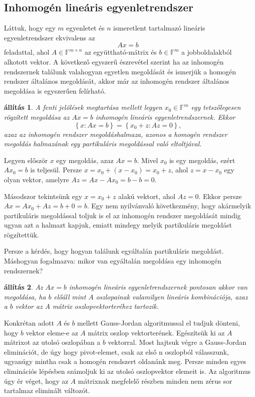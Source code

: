 \documentclass[9pt, showtrims]{memoir}
\makeatletter
\renewenvironment{proof}[1][\proofname]
    {\par\pushQED{\qed}%
    \normalfont \topsep6\p@\@plus6\p@\relax
    \trivlist
    \item[\hskip\labelsep
        \itshape
    #1\@addpunct{:}]\ignorespaces}
    {\popQED\endtrivlist\@endpefalse}
\theoremstyle{plain}
\newtheorem{proposition}{állítás}[section]
\theoremstyle{remark}
\theoremstyle{definition}
\makeatother
\begin{document}
\subsection{Inhomogén lineáris egyenletrendszer}
Láttuk, hogy egy $m$ egyenletet és $n$ ismeretlent tartalmazó lineáris egyenletrendszer ekvivalens az 
\[
    Ax=b
\]
feladattal, ahol $A\in\mathbb{F}^{m\times n}$ az együttható-mátrix és $b\in\mathbb{F}^m$
a jobboldalakból alkotott vektor.
A következő egyszerű észrevétel szerint ha az inhomogén rendszernek találunk valahogyan egyetlen megoldását és ismerjük a homogén rendszer általános megoldását,
akkor már az inhomogén rendszer általános megoldása is egyszerűen felírható.
\begin{proposition}
    A fenti jelölések megtartása mellett
    legyen $x_0\in\mathbb{F}^m$ egy tetszőlegesen rögzített megoldása az $Ax=b$ inhomogén lineáris egyenletrendszernek.
    Ekkor
    \[
        \left\{ x:Ax=b \right\}
        =
        \left\{ x_0+z:Az=0 \right\},
    \]
    azaz az inhomogén rendszer megoldáshalmaza, 
    azonos a homogén rendszer megoldás halmazának egy partikuláris megoldással való 
    eltoltjával.
\end{proposition}
\begin{proof}
    Legyen először $x$ egy megoldás, azaz $Ax=b$. 
    Mivel $x_0$ is egy megoldás, ezért $Ax_{0}=b$ is teljesül.
    Persze $x=x_0+\left( x-x_0 \right)=x_0+z$, ahol $z=x-x_0$ egy olyan vektor,
    amelyre $Az=Ax-Ax_0=b-b=0$.

    Másodszor tekintsünk egy $x=x_0+z$ alakú vektort, ahol $Az=0$.
    Ekkor persze $Ax=Ax_0+Az=b+0=b$.
\end{proof}
Egy nem nyilvánvaló következmény, 
hogy akármelyik partikuláris megoldással toljuk is el az
inhomogén rendszer megoldását mindig ugyan azt a halmazt kapjuk, 
emiatt mindegy melyik partikuláris megoldást rögzítettük.

Persze a kérdés, hogy hogyan találunk egyáltalán partikuláris megoldást.
Máshogyan fogalmazva: mikor van egyáltalán megoldása egy inhomogén rendszernek?
\begin{proposition}
    Az $Ax=b$ inhomogén lineáris egyenletrendszernek pontosan akkor van megoldása, 
    ha $b$ előáll mint $A$ oszlopainak valamilyen lineáris kombinációja, 
    azaz a $b$ vektor az $A$ mátrix oszlopvektorteréhez tartozik.
\end{proposition}
Konkrétan adott $A$ és $b$ mellett Gauss-Jordan algoritmussal el tudjuk dönteni, hogy
$b$ vektor eleme-e az $A$ mátrix oszlop vektorterének.
Egészítsük ki az $A$ mátrixot az utolsó oszlopában a $b$ vektorral.
Most hajtsuk végre a Gauss-Jordan eliminációt, de úgy hogy pivot-elemet,
csak az első n oszlopból válasszunk, ugyanúgy mintha csak a homogén rendszert oldanánk meg.
Persze minden egyes eliminációs lépésben számoljuk ki az utolsó oszlopvektor elemeit is.
Az algoritmus úgy ér véget, 
hogy az $A$ mátrixnak megfelelő részben minden nem zérus sor tartalmaz eliminált változót.
\end{document}
